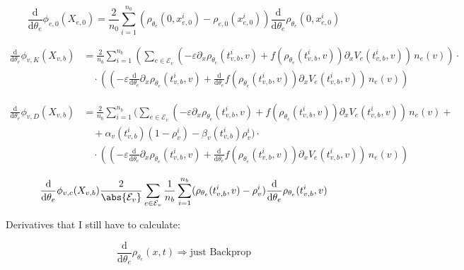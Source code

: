 \begin{equation*}
    \frac{\mathrm{d}}{\mathrm{d} \theta_e} \phi_{e,0} (X_{e,0}) = \frac{2}{n_0} \sum_{i=1}^{n_0} (\rho_{\theta_e} (0,x_{e,0}^i) - \rho_{e,0}(x_{e,0}^i)) \frac{\mathrm{d}}{\mathrm{d} \theta_e} \rho_{\theta_e} (0,x_{e,0}^i)
\end{equation*}

\begin{align*}
    \frac{\mathrm{d}}{\mathrm{d} \theta_e} \phi_{v,K} (X_{v,b}) & = \frac{2}{n_b} \sum_{i=1}^{n_b} (\sum_{e \in \mathcal{E}_v} (- \varepsilon \partial_x \rho_{\theta_e} (t_{v,b}^i, v) + f(\rho_{\theta_e} (t_{v,b}^i, v)) \partial_x V_e(t_{v,b}^i, v)) \, n_e (v)) \cdot \\ 
    & \quad \cdot ((- \varepsilon \frac{\mathrm{d}}{\mathrm{d} \theta_e} \partial_x \rho_{\theta_e} (t_{v,b}^i, v) + \frac{\mathrm{d}}{\mathrm{d} \theta_e} f(\rho_{\theta_e} (t_{v,b}^i, v)) \partial_x V_e(t_{v,b}^i, v)) \, n_e (v))
\end{align*}

\begin{align*}
    \frac{\mathrm{d}}{\mathrm{d} \theta_e} \phi_{v,D} (X_{v,b}) & = \frac{2}{n_b} \sum_{i=1}^{n_b} ( \sum_{e\in \mathcal{E}_v} (-\varepsilon \partial_x \rho_{\theta_e} (t_{v,b}^i, v) + f(\rho_{\theta_e} (t_{v,b}^i, v)) \partial_x V_e(t_{v,b}^i, v)) \, n_e (v) + \\ 
    & \quad + \alpha_v(t_{v,b}^i) (1-\rho_v^i) - \beta_v(t_{v,b}^i) \rho_v^i )  \cdot \\
    & \quad \cdot ((-\varepsilon \frac{\mathrm{d}}{\mathrm{d} \theta_e} \partial_x \rho_{\theta_e} (t_{v,b}^i, v) + \frac{\mathrm{d}}{\mathrm{d} \theta_e} f(\rho_{\theta_e} (t_{v,b}^i, v)) \partial_x V_e(t_{v,b}^i, v)) \, n_e (v))
\end{align*}

\begin{equation*}
    \frac{\mathrm{d}}{\mathrm{d} \theta_e} \phi_{v,c} (X_{v,b}) \frac{2}{\abs{\mathcal{E}_v}} \sum_{e \in \mathcal{E}_v} \frac{1}{n_b} \sum_{i=1}^{n_b} ( \rho_{\theta_e} (t_{v,b}^i, v) - \rho_{v}^i) \frac{\mathrm{d}}{\mathrm{d} \theta_e} \rho_{\theta_e} (t_{v,b}^i, v)
\end{equation*}

Derivatives that I still have to calculate:

\begin{equation*}
    \frac{\mathrm{d}}{\mathrm{d} \theta_e} \rho_{\theta_e}(x, t) \Rightarrow \text{just Backprop}
\end{equation*}

